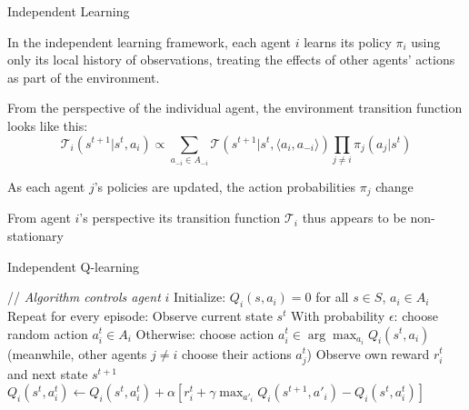 \begin{frame}{Independent Learning}

In the independent learning framework, each agent $i$ learns its policy $\pi_i$ using only its local history of observations, treating the effects of other agents' actions as part of the environment.

\blist
    \item From the perspective of the individual agent, the environment transition function looks like this:
\elist
\vspace{5pt}
\[
\mathcal{T}_i(s^{t+1} | s^t, a_i) \propto \sum_{a_{-i} \in A_{-i}} \mathcal{T}(s^{t+1} | s^t, \langle a_i, a_{-i} \rangle) \prod_{j \neq i} \pi_j(a_j | s^t)
\]
\blist
    \item As each agent $j$'s policies are updated, the action probabilities $\pi_j$ change
    \item From agent $i$'s perspective its transition function $\mathcal{T}_i$ thus appears to be non-stationary
\elist
    
\end{frame}

\begin{frame}{Independent Q-learning}

\State // \textit{Algorithm controls agent} \( i \)
\State Initialize: \( Q_i(s, a_i) = 0 \) for all \( s \in S \), \( a_i \in A_i \)
\State Repeat for every episode:
    \State Observe current state \( s^t \)
    \State With probability \( \epsilon \): choose random action \( a_i^t \in A_i \)
    \State Otherwise: choose action \( a_i^t \in \arg\max_{a_i} Q_i(s^t, a_i) \)
    \State (meanwhile, other agents \( j \neq i \) choose their actions \( a_j^t \))
    \State Observe own reward \( r_i^t \) and next state \( s^{t+1} \)
    \State \( Q_i(s^t, a_i^t) \leftarrow Q_i(s^t, a_i^t) + \alpha [ r_i^t + \gamma \max_{a'_i} Q_i(s^{t+1}, a'_i) - Q_i(s^t, a_i^t) ] \)
\EndFor
\ealg
\end{frame}

